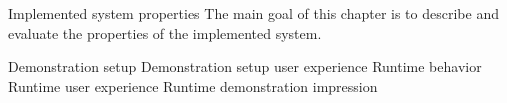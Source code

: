 \chap Implemented system properties
The main goal of this chapter is to describe and evaluate the properties of the implemented system.

\sec Demonstration setup
\sec Demonstration setup user experience
\sec Runtime behavior
\sec Runtime user experience
\sec Runtime demonstration impression